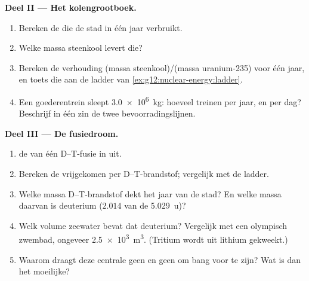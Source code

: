 \begin{problem}
\medskip
\noindent\textbf{Deel II --- Het kolengrootboek.}
\begin{enumerate}[resume]
  \item Bereken de  die de stad in één jaar verbruikt.
  \item Welke massa steenkool levert die?
  \item Bereken de verhouding (massa steenkool)/(massa uranium-235) voor één
        jaar, en toets die aan de ladder van
        \cref{ex:g12:nuclear-energy:ladder}.
  \item Een goederentrein sleept \qty{3.0e6}{kg}: hoeveel treinen per jaar, en
        per dag? Beschrijf in één zin de twee bevoorradingslijnen.
\end{enumerate}

\medskip
\noindent\textbf{Deel III --- De fusiedroom.}
\begin{enumerate}[resume]
  \item {} de  van één D--T-fusie in  uit.
  \item Bereken de vrijgekomen  per  D--T-brandstof; vergelijk
        met de ladder.
  \item Welke massa D--T-brandstof dekt het jaar van de stad? En welke massa
        daarvan is deuterium ($2.014$ van de \qty{5.029}{u})?
  \item Welk volume zeewater bevat dat deuterium? Vergelijk met een olympisch
        zwembad, ongeveer \qty{2.5e3}{m^3}. (Tritium wordt uit lithium
        gekweekt.)
  \item Waarom draagt deze centrale geen  en geen
         om bang voor te zijn? Wat is dan het moeilijke?
\end{enumerate}


\end{problem}
